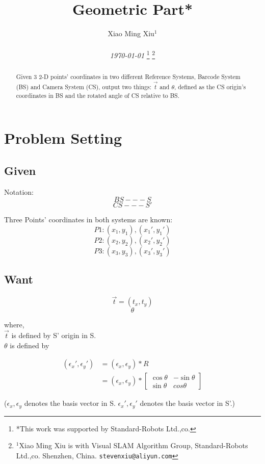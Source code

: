 \documentclass[letterpaper, 10 pt, conference]{ieeeconf}  %
\title{\LARGE \bf
Geometric Part*
}
\author{Xiao Ming Xiu$^{1}$  \\%
\\
\footnotesize\textit{\today}
\thanks{*This work was supported by Standard-Robots Ltd.,co.}%
\thanks{$^{1}$Xiao Ming Xiu is with Visual SLAM Algorithm Group, Standard-Robots Ltd.,co. Shenzhen, China. 
        {\tt\small stevenxiu@aliyun.com}}%
}
\theoremstyle{remark}
\begin{document}
\maketitle
\thispagestyle{empty}
\pagestyle{empty}


\begin{abstract}
Given 3 2-D points' coordinates in two different Reference Systems, Barcode System (BS) and Camera System (CS), output two things:  $\vec{t}$ and $\theta$, defined as the CS origin's coordinates in BS and the rotated angle of CS relative to BS.  

\end{abstract}


\section{Problem Setting}
\subsection{Given}
Notation: $$ BS --- S $$  $$ CS --- S' $$

Three Points' coordinates in both systems are known:
$$ P1:  (x_1,y_1), (x_1',y_1') $$
$$ P2:  (x_2,y_2), (x_2',y_2') $$
$$ P3:  (x_3,y_3), (x_3',y_3') $$

\subsection{Want}
$$\vec{t} = (t_x, t_y)$$
$$ \theta $$

where, \\$\vec{t}$ is defined by S' origin in S.\\
$\theta$ is defined by

\begin{equation}
\begin{aligned}
(\epsilon_x',\epsilon_y')&= (\epsilon_x,\epsilon_y)*R\\
						&= (\epsilon_x,\epsilon_y)*
\begin{bmatrix}
\cos{\theta}&-\sin{\theta}\\
\sin{\theta}&cos{\theta}
\end{bmatrix}
\end{aligned}
\end{equation}

($\epsilon_x, \epsilon_y$ denotes the basis vector in S.  $\epsilon_x', \epsilon_y'$ denotes the basis vector in S'.)
\end{document}
